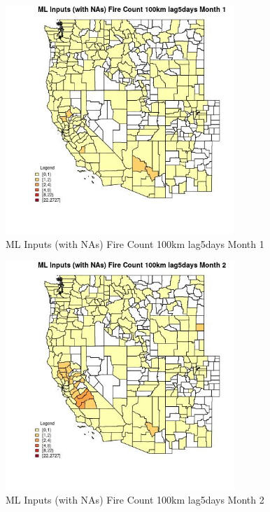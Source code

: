 \begin{figure} 
\centering  
\includegraphics[width=0.77\textwidth]{Code_Outputs/Report_ML_input_PM25_Step4_part_f_de_duplicated_aves_prioritize_24hr_obswNAs_CountyFire_Count_100km_lag5daysmedianMonth1.jpg} 
\caption{\label{fig:Report_ML_input_PM25_Step4_part_f_de_duplicated_aves_prioritize_24hr_obswNAsCountyFire_Count_100km_lag5daysmedianMonth1}ML Inputs (with NAs) Fire Count 100km lag5days Month 1} 
\end{figure} 
 

\begin{figure} 
\centering  
\includegraphics[width=0.77\textwidth]{Code_Outputs/Report_ML_input_PM25_Step4_part_f_de_duplicated_aves_prioritize_24hr_obswNAs_CountyFire_Count_100km_lag5daysmedianMonth2.jpg} 
\caption{\label{fig:Report_ML_input_PM25_Step4_part_f_de_duplicated_aves_prioritize_24hr_obswNAsCountyFire_Count_100km_lag5daysmedianMonth2}ML Inputs (with NAs) Fire Count 100km lag5days Month 2} 
\end{figure} 
 

